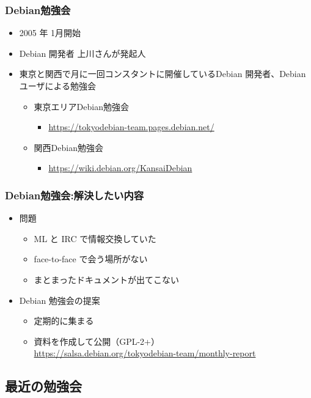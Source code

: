 \begin{frame}
  
\frametitle{Debian勉強会}
\begin{itemize}
 \item 2005 年 1月開始
 \item Debian 開発者 上川さんが発起人
 \item 東京と関西で月に一回コンスタントに開催しているDebian 開発者、Debian ユーザによる勉強会
   \begin{itemize}
   \item 東京エリアDebian勉強会
     \begin{itemize}
     \item \url{https://tokyodebian-team.pages.debian.net/}
     \end{itemize}
   \item 関西Debian勉強会
     \begin{itemize}
     \item \url{https://wiki.debian.org/KansaiDebian}
     \end{itemize}
   \end{itemize}
\end{itemize}

\end{frame}


\begin{frame}

\frametitle{Debian勉強会:解決したい内容}
\begin{itemize}
 \item 問題
   \begin{itemize}
   \item ML と IRC で情報交換していた
   \item face-to-face で会う場所がない
   \item まとまったドキュメントが出てこない
   \end{itemize}
 \item Debian 勉強会の提案
   \begin{itemize}
   \item 定期的に集まる
   \item 資料を作成して公開（GPL-2+） \\
	 {\small \url{https://salsa.debian.org/tokyodebian-team/monthly-report}}
   \end{itemize}
\end{itemize}

\end{frame}


\subsection{最近の勉強会}


